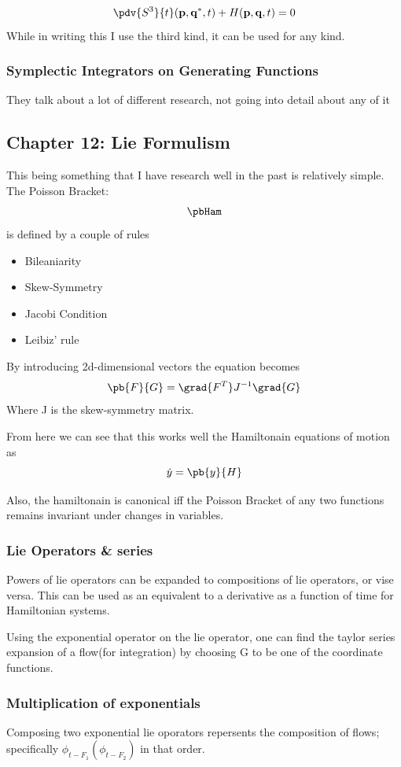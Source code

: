 \[
\pdv{S^3}{t}(\mathbf{p}, \mathbf{q^{*}}, t)+H(\mathbf{p}, \mathbf{q}, t) = 0
\]
While in writing this I use the third kind, it can be used for any kind.
\subsubsection{Symplectic Integrators on Generating Functions}
They talk about a lot of different research, not going into detail about any of it

\subsection{Chapter 12: Lie Formulism}
This being something that I have research well in the past is relatively simple. The Poisson Bracket:
\[
\pbHam
\]
is defined by a couple of rules
\begin{itemize}
    \item Bileaniarity
    \item Skew-Symmetry
    \item Jacobi Condition
    \item Leibiz' rule
\end{itemize}
By introducing 2d-dimensional vectors the equation becomes
\[
\pb{F}{G}= \grad{F^T}J^{-1} \grad{G}
\]
Where J is the skew-symmetry matrix.

From here we can see that this works well the Hamiltonain equations of motion as
\[
\dot{y} = \pb{y}{H}
\]

Also, the hamiltonain is canonical iff the Poisson Bracket of any two functions remains invariant under changes in variables.

\subsubsection{Lie Operators \& series}
Powers of lie operators can be expanded to compositions of lie operators, or vise versa. This can be used as an equivalent to a derivative as a function of time for Hamiltonian systems.

Using the exponential operator on the lie operator, one can find the taylor series expansion of a flow(for integration) by choosing G to be one of the coordinate functions.
\subsubsection{Multiplication of exponentials}
Composing two exponential lie oporators repersents the composition of flows; specifically $\phi_{t-F_1}(\phi_{t-F_2})$ in that order.

